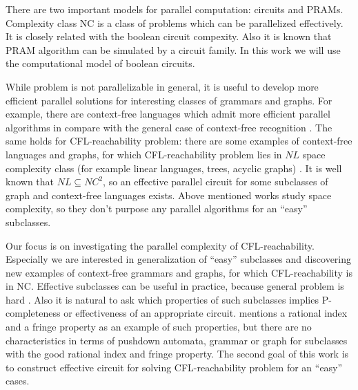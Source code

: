 \documentclass[smallextended]{svjour3}       %
\begin{document}
There are two important models for parallel computation: circuits and PRAMs. Complexity class NC is a class of problems which can be parallelized effectively. It is closely related with the boolean circuit compexity. Also it is known that PRAM algorithm can be simulated by a circuit family. In this work we will use the computational model of boolean circuits.


While problem is not parallelizable in general, it is useful to develop more efficient parallel solutions for interesting classes of grammars and graphs. For example, there are context-free languages which admit more efficient parallel algorithms in compare with the general case of context-free recognition \cite*{IBARRA, IBARRA2}.  The same holds for CFL-reachability problem: there are some examples of context-free languages and graphs, for which CFL-reachability problem lies in $NL$ space complexity class (for example linear languages, trees, acyclic graphs) \cite*{Regularrealizability, LReach}. It is well known that $NL \subseteq NC^2$, so an effective parallel circuit for some subclasses of graph and context-free languages exists. Above mentioned works study space complexity, so they don't purpose any parallel algorithms for an ``easy'' subclasses. 

Our focus is on investigating the parallel complexity of CFL-reachability. Especially we are interested in generalization of ``easy'' subclasses and discovering new examples of context-free grammars and graphs, for which CFL-reachability is in NC. Effective subclasses can be useful in practice, because general problem is hard \cite{ExperimentalCFPQ}. Also it is natural to ask which properties of such subclasses implies P-completeness or effectiveness of an appropriate circuit. \cite*{Regularrealizability, ChainQ} mentions a rational index and a fringe property as an example of such properties, but there are no characteristics in terms of pushdown automata, grammar or graph for subclasses with the good rational index and fringe property. The second goal of this work is to construct effective circuit for solving CFL-reachability problem for an ``easy'' cases.
\end{document}
